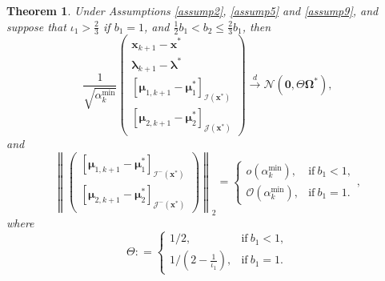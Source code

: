 \documentclass[aos]{imsart}
\numberwithin{equation}{section}
\theoremstyle{plain}
\newtheorem{theorem}{Theorem}
\begin{document}
\begin{theorem}
\label{theorem_asymptotic_almost_sure}
    Under Assumptions \ref{assump2}, \ref{assump5} and  \ref{assump9}, and suppose that $\iota_1>\frac{2}{3}$ if $b_1=1$, and $\frac{1}{2} b_1 < b_2 \leq \frac{2}{3}b_1$, then 
    \begin{equation}
        \frac{1}{\sqrt{\alpha_k^{\text{min}}}} \left( \begin{array}{c}
    \bm{x}_{k+1} - \bm{x}^{*}  \\
    \bm{\lambda}_{k+1} - \bm{\lambda}^{*} \\
    \left[ \bm{\mu}_{1,k+1} - \bm{\mu}_{1}^{*}\right]_{\mathcal{I}(\bm{x}^{*})} \\
    \left[ \bm{\mu}_{2,k+1} - \bm{\mu}_{2}^{*} \right]_{\mathcal{J}(\bm{x}^{*})} 
    \end{array} \right) \stackrel{d}{\longrightarrow} \mathcal{N} \left( \bm{0}, \Theta \bm{\Omega}^{*} \right),
    \end{equation}
    and
    \begin{equation}
        \left\| \left( \begin{array}{cc}
             \left[ \bm{\mu}_{1,k+1} - \bm{\mu}_{1}^{*}\right]_{\mathcal{I}^{-}(\bm{x}^{*})} \\
            \left[ \bm{\mu}_{2,k+1} - \bm{\mu}_{2}^{*} \right]_{\mathcal{J}^{-}(\bm{x}^{*})} 
        \end{array} \right) \right\|_2 = \left\{ \begin{array}{cc}
               o\left( \alpha_k^{\text{min}}\right),  & \text{if}~b_1 < 1, \\
               \mathcal{O}\left( \alpha_k^{\text{min}}\right),  & \text{if}~b_1 = 1.
            \end{array} \right.,
    \end{equation}
    where
    \begin{equation*}
        \Theta : = \left\{ \begin{array}{cc}
               1/2,  & \text{if}~b_1 < 1, \\
               1/\left(2 - \frac{1}{\iota_1}\right),  & \text{if}~b_1 = 1.
            \end{array} \right.
    \end{equation*}
    
\end{theorem}
\end{document}
